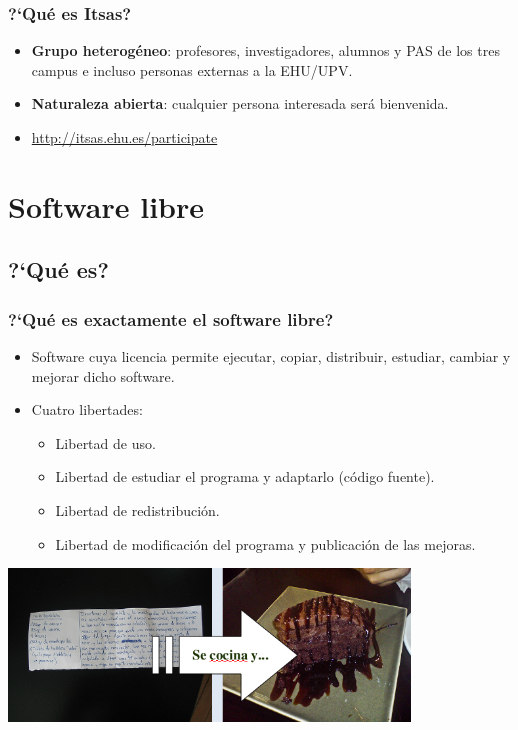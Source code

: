 \documentclass[xcolor=dvipsnames]{beamer}    %
\begin{document}
\begin{frame}\frametitle{?`Qué es Itsas?}
    \begin{itemize}

    \item \textbf{Grupo heterog\'eneo}: profesores, investigadores, alumnos y 
PAS de los tres campus e
	     incluso personas externas a la EHU/UPV.
     \item \textbf{Naturaleza abierta}: cualquier persona interesada
ser\'a
	         bienvenida.
    \item \url{http://itsas.ehu.es/participate}
   \end{itemize}
\end{frame}

\section{Software libre}
\subsection{?`Qu\'e es?}
\begin{frame}\frametitle{?`Qu\'e es exactamente el software libre?}
    \begin{itemize}
    \item Software cuya licencia permite ejecutar, copiar, distribuir,
estudiar, cambiar y mejorar dicho software. 
    \item Cuatro libertades:
      \begin{itemize}
      \item Libertad de uso.
      \item Libertad de estudiar el programa y adaptarlo (c\'odigo fuente).
      \item Libertad de redistribuci\'on.
      \item Libertad de modificaci\'on del programa y publicaci\'on de las
mejoras.
\end{itemize}
       \end{itemize}
             \begin{center}
  \includegraphics[width=0.8\textwidth]{./Utils/receta_pastel.png}              
                                                                \end{center}
       \end{frame}
\end{document}
